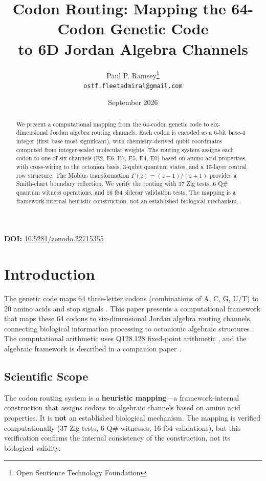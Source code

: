 \documentclass[11pt]{article}
\title{Codon Routing: Mapping the 64-Codon Genetic Code \\
to 6D Jordan Algebra Channels}
\author{
Paul P. Ramsey\thanks{Open Sentience Technology Foundation} \\
\texttt{ostf.fleetadmiral@gmail.com}
}
\date{September 2026}
\begin{document}
\maketitle

\noindent\textbf{DOI:} \href{https://doi.org/10.5281/zenodo.22715355}{10.5281/zenodo.22715355}

\begin{abstract}
We present a computational mapping from the 64-codon genetic code to six-dimensional Jordan algebra routing channels. Each codon is encoded as a 6-bit base-4 integer (first base most significant), with chemistry-derived qubit coordinates computed from integer-scaled molecular weights. The routing system assigns each codon to one of six channels (E2, E6, E7, E5, E4, E0) based on amino acid properties, with cross-wiring to the octonion basis, 3-qubit quantum states, and a 15-layer central row structure. The M\"obius transformation $\Gamma(z) = (z-1)/(z+1)$ provides a Smith-chart boundary reflection. We verify the routing with 37 Zig tests, 6 Q\# quantum witness operations, and 16 f64 sidecar validation tests. The mapping is a framework-internal heuristic construction, not an established biological mechanism.
\end{abstract}

\tableofcontents
\newpage

\section{Introduction}

The genetic code maps 64 three-letter codons (combinations of A, C, G, U/T) to 20 amino acids and stop signals \cite{crick1968codon}. This paper presents a computational framework that maps these 64 codons to six-dimensional Jordan algebra routing channels, connecting biological information processing to octonionic algebraic structures \cite{petoukhov2011, frontiers2024codon}. The computational arithmetic uses Q128.128 fixed-point arithmetic \cite{ramsey2026q128}, and the algebraic framework is described in a companion paper \cite{ramsey2026framework}.

\subsection{Scientific Scope}

The codon routing system is a \textbf{heuristic mapping}---a framework-internal construction that assigns codons to algebraic channels based on amino acid properties. It is \textbf{not} an established biological mechanism. The mapping is verified computationally (37 Zig tests, 6 Q\# witnesses, 16 f64 validations), but this verification confirms the internal consistency of the construction, not its biological validity.
\end{document}
